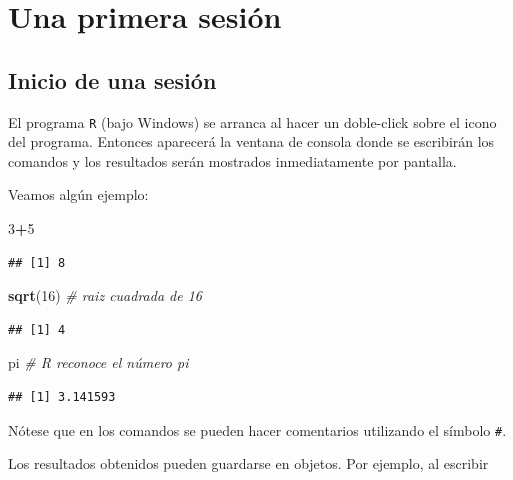 \documentclass[]{book}
\newenvironment{Shaded}{\begin{snugshade}}{\end{snugshade}}
\newcommand{\CommentTok}[1]{\textcolor[rgb]{0.56,0.35,0.01}{\textit{#1}}}
\newcommand{\DecValTok}[1]{\textcolor[rgb]{0.00,0.00,0.81}{#1}}
\newcommand{\KeywordTok}[1]{\textcolor[rgb]{0.13,0.29,0.53}{\textbf{#1}}}
\newcommand{\NormalTok}[1]{#1}
\newcommand{\OperatorTok}[1]{\textcolor[rgb]{0.81,0.36,0.00}{\textbf{#1}}}
\begin{document}
\hypertarget{una-primera-sesion}{%
\section{Una primera sesión}\label{una-primera-sesion}}

\hypertarget{inicio-de-una-sesion}{%
\subsection{Inicio de una sesión}\label{inicio-de-una-sesion}}

El programa \texttt{R} (bajo
Windows) se arranca al hacer un doble-click sobre el icono del programa.
Entonces aparecerá la ventana de consola donde se escribirán los
comandos y los resultados serán mostrados inmediatamente por pantalla.

Veamos algún ejemplo:

\begin{Shaded}
\begin{Highlighting}[]
\DecValTok{3}\OperatorTok{+}\DecValTok{5}
\end{Highlighting}
\end{Shaded}

\begin{verbatim}
## [1] 8
\end{verbatim}

\begin{Shaded}
\begin{Highlighting}[]
\KeywordTok{sqrt}\NormalTok{(}\DecValTok{16}\NormalTok{) }\CommentTok{# raiz cuadrada de 16}
\end{Highlighting}
\end{Shaded}

\begin{verbatim}
## [1] 4
\end{verbatim}

\begin{Shaded}
\begin{Highlighting}[]
\NormalTok{pi }\CommentTok{# R reconoce el número pi}
\end{Highlighting}
\end{Shaded}

\begin{verbatim}
## [1] 3.141593
\end{verbatim}

Nótese que en los comandos se pueden hacer comentarios utilizando el
símbolo \texttt{\#}.

Los resultados obtenidos pueden guardarse en objetos. Por
ejemplo, al escribir
\end{document}
